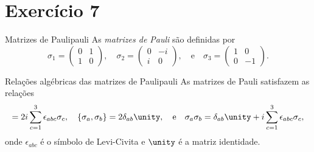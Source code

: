 \section{Exercício 7}
\begin{definition}{Matrizes de Pauli}{pauli}
    As \emph{matrizes de Pauli} são definidas por
    \begin{equation*}
        \sigma_1 = \begin{pmatrix}
            0&1\\1&0
        \end{pmatrix},\quad\sigma_2 = \begin{pmatrix}
            0&-i\\i&0
        \end{pmatrix},\quad\text{e}\quad\sigma_3 = \begin{pmatrix}
            1&0\\0&-1
        \end{pmatrix}.
    \end{equation*}
\end{definition}
\begin{proposition}{Relações algébricas das matrizes de Pauli}{pauli}
    As matrizes de Pauli satisfazem as relações
    \begin{equation*}
        [\sigma_a,\sigma_b] = 2i \sum_{c = 1}^3 \epsilon_{abc}\sigma_c,\quad
        \{\sigma_a, \sigma_b\} = 2\delta_{ab} \unity,\quad\text{e}\quad
        \sigma_a \sigma_b = \delta_{ab} \unity + i \sum_{c = 1}^3 \epsilon_{abc}\sigma_c,
    \end{equation*}
    onde \(\epsilon_{abc}\) é o símbolo de Levi-Civita e \(\unity\) é a matriz identidade.
\end{proposition}
